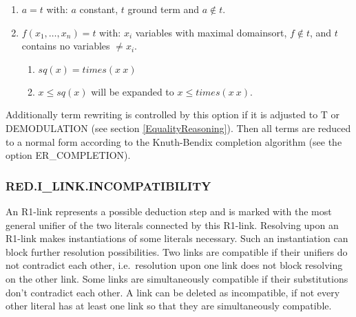 \begin{enumerate}
\item $a = t$     with: $a$ constant, $t$ ground term and $a \not\in t$.
\item $f(x_1, \dots , x_n) = t$  with:   $x_i$ variables with maximal 
domainsort, $f \not\in t$, and $t$ contains no variables $\neq x_i$.

\Ex
\begin{enumerate}
    \item    $sq (x) = times (x\ x)$
    \item   $x \le sq(x)$
will be expanded to   $x \le times (x\ x)$.
\end{enumerate}
\end{enumerate}

Additionally term rewriting is controlled by this option if it is
adjusted to T or DEMODULATION (see section \ref{EqualityReasoning}).
Then all terms are reduced to a normal form according to the
Knuth-Bendix completion algorithm (see the option ER\_COMPLETION).

\PO


\subsubsection{RED.I\_LINK.INCOMPATIBILITY}
  

An R1-link represents a possible deduction step and is marked with the 
most general unifier of the two literals connected by this R1-link. 
Resolving upon an R1-link makes instantiations of some literals necessary. 
Such an instantiation can block further resolution possibilities. Two links 
are compatible if their unifiers do not contradict each other, i.e.\
resolution upon one link does not block resolving on the other link. Some 
links are simultaneously compatible if their substitutions don't contradict 
each other. A link can be deleted as incompatible, if not every other literal 
has at least one link so that they are simultaneously compatible.

